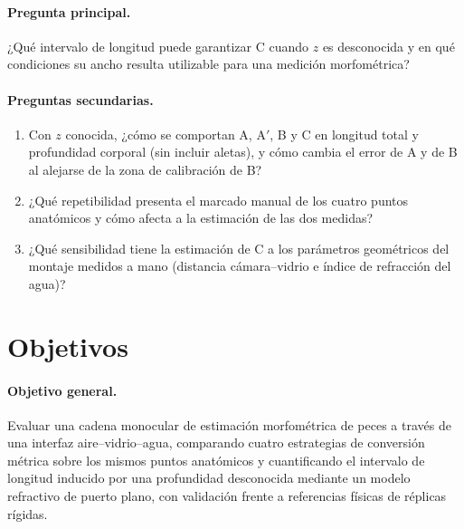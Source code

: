 \documentclass{report}
\newcommand{\Aprime}{A$'$}
\begin{document}
\paragraph{Pregunta principal.} ¿Qué intervalo de longitud puede garantizar C cuando $z$ es desconocida y en qué condiciones su ancho resulta utilizable para una medición morfométrica?

\paragraph{Preguntas secundarias.}
\begin{enumerate}
  \item Con $z$ conocida, ¿cómo se comportan A, \Aprime, B y C en longitud total y profundidad corporal (sin incluir aletas), y cómo cambia el error de A y de B al alejarse de la zona de calibración de B?
  \item ¿Qué repetibilidad presenta el marcado manual de los cuatro puntos anatómicos y cómo afecta a la estimación de las dos medidas?
  \item ¿Qué sensibilidad tiene la estimación de C a los parámetros geométricos del montaje medidos a mano (distancia cámara--vidrio e índice de refracción del agua)?
\end{enumerate}

\section{Objetivos}

\paragraph{Objetivo general.} Evaluar una cadena monocular de estimación morfométrica de peces a través de una interfaz aire--vidrio--agua, comparando cuatro estrategias de conversión métrica sobre los mismos puntos anatómicos y cuantificando el intervalo de longitud inducido por una profundidad desconocida mediante un modelo refractivo de puerto plano, con validación frente a referencias físicas de réplicas rígidas.
\end{document}
